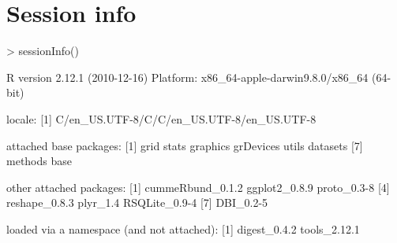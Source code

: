 \documentclass[10pt]{article}
\begin{document}
\section{Session info}
\begin{Schunk}
\begin{Sinput}
> sessionInfo()
\end{Sinput}
\begin{Soutput}
R version 2.12.1 (2010-12-16)
Platform: x86_64-apple-darwin9.8.0/x86_64 (64-bit)

locale:
[1] C/en_US.UTF-8/C/C/en_US.UTF-8/en_US.UTF-8

attached base packages:
[1] grid      stats     graphics  grDevices utils     datasets 
[7] methods   base     

other attached packages:
[1] cummeRbund_0.1.2 ggplot2_0.8.9    proto_0.3-8     
[4] reshape_0.8.3    plyr_1.4         RSQLite_0.9-4   
[7] DBI_0.2-5       

loaded via a namespace (and not attached):
[1] digest_0.4.2 tools_2.12.1
\end{Soutput}
\end{Schunk}
\end{document}
